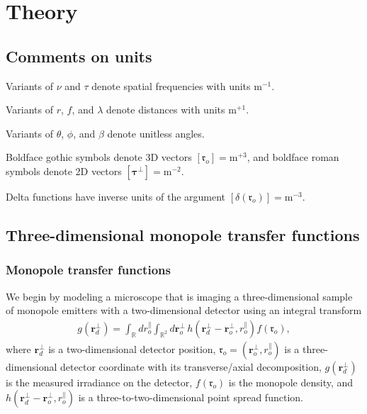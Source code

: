 \documentclass[]{osa-article}
\providecommand{\ro}{\boldsymbol{\mathfrak{r}}_o}
\newcommand{\mypar}{\parallel}
\providecommand{\ropar}{r_o^{\mypar}}
\providecommand{\roperp}{\mathbf{r}_o^{\bot}}
\providecommand{\rd}{\mathbf{r}^{\bot}_d}
\providecommand{\mbb}[1]{\mathbb{#1}}
\providecommand{\bs}[1]{\boldsymbol{#1}}
\providecommand{\btperp}{\bs{\tau}^{\bot}}
\begin{document}
\section{Theory}
\subsection{Comments on units}
Variants of $\nu$ and $\tau$ denote spatial frequencies with units
$\text{m}^{-1}$.

\noindent Variants of $r$, $f$, and $\lambda$ denote distances with units $\text{m}^{+1}$.

\noindent Variants of $\theta$, $\phi$, and $\beta$ denote unitless angles.

\noindent Boldface gothic symbols denote 3D vectors $[\ro] = \text{m}^{+3}$, and boldface roman symbols denote 2D vectors $[\btperp] = \text{m}^{-2}$.

\noindent Delta functions have inverse units of the argument $[\delta(\ro)] = \text{m}^{-3}$.

\subsection{Three-dimensional monopole transfer functions}
\subsubsection{Monopole transfer functions}
We begin by modeling a microscope that is imaging a three-dimensional sample of monopole emitters with a two-dimensional detector using an integral transform
\begin{align}
  g(\rd) = \int_{\mbb{R}}d\ropar\int_{\mbb{R}^2}d\roperp\, h(\rd - \roperp, \ropar)f(\ro),\label{eq:opener}
\end{align}
where $\rd$ is a two-dimensional detector position, $\ro = (\roperp, \ropar)$ is a three-dimensional detector coordinate with its transverse/axial decomposition, $g(\rd)$ is the measured irradiance on the detector, $f(\ro)$ is the monopole density, and $h(\rd - \roperp, \ropar)$ is a three-to-two-dimensional point spread function. 
\end{document}
